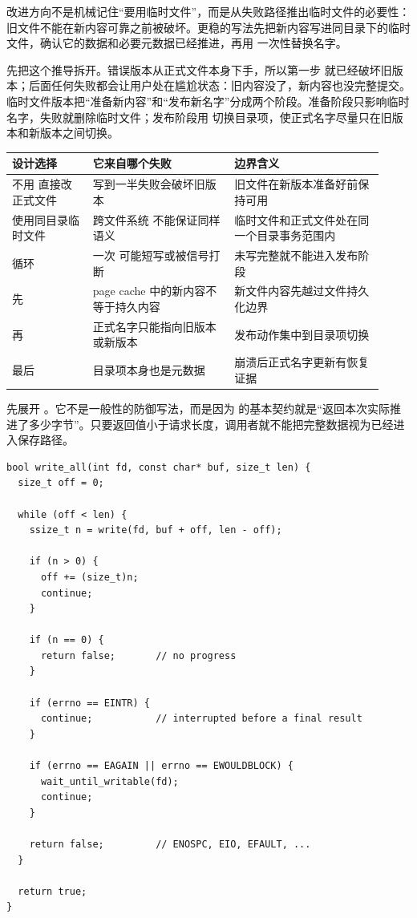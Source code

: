 改进方向不是机械记住“要用临时文件”，而是从失败路径推出临时文件的必要性：旧文件不能在新内容可靠之前被破坏。更稳的写法先把新内容写进同目录下的临时文件，确认它的数据和必要元数据已经推进，再用  一次性替换名字。

先把这个推导拆开。错误版本从正式文件本身下手，所以第一步  就已经破坏旧版本；后面任何失败都会让用户处在尴尬状态：旧内容没了，新内容也没完整提交。临时文件版本把“准备新内容”和“发布新名字”分成两个阶段。准备阶段只影响临时名字，失败就删除临时文件；发布阶段用  切换目录项，使正式名字尽量只在旧版本和新版本之间切换。

\begin{longtable}{|L{0.2\linewidth}|L{0.35\linewidth}|L{0.37\linewidth}|}
\toprule
设计选择 & 它来自哪个失败 & 边界含义 \\
\midrule
不用  直接改正式文件 & 写到一半失败会破坏旧版本 & 旧文件在新版本准备好前保持可用 \\\tablerowrule
使用同目录临时文件 & 跨文件系统  不能保证同样语义 & 临时文件和正式文件处在同一个目录事务范围内 \\\tablerowrule
循环  & 一次  可能短写或被信号打断 & 未写完整就不能进入发布阶段 \\\tablerowrule
先  & page cache 中的新内容不等于持久内容 & 新文件内容先越过文件持久化边界 \\\tablerowrule
再  & 正式名字只能指向旧版本或新版本 & 发布动作集中到目录项切换 \\\tablerowrule
最后  & 目录项本身也是元数据 & 崩溃后正式名字更新有恢复证据 \\
\bottomrule
\end{longtable}

先展开 。它不是一般性的防御写法，而是因为  的基本契约就是“返回本次实际推进了多少字节”。只要返回值小于请求长度，调用者就不能把完整数据视为已经进入保存路径。

\begin{lstlisting}
bool write_all(int fd, const char* buf, size_t len) {
  size_t off = 0;

  while (off < len) {
    ssize_t n = write(fd, buf + off, len - off);

    if (n > 0) {
      off += (size_t)n;
      continue;
    }

    if (n == 0) {
      return false;       // no progress
    }

    if (errno == EINTR) {
      continue;           // interrupted before a final result
    }

    if (errno == EAGAIN || errno == EWOULDBLOCK) {
      wait_until_writable(fd);
      continue;
    }

    return false;         // ENOSPC, EIO, EFAULT, ...
  }

  return true;
}
\end{lstlisting}

